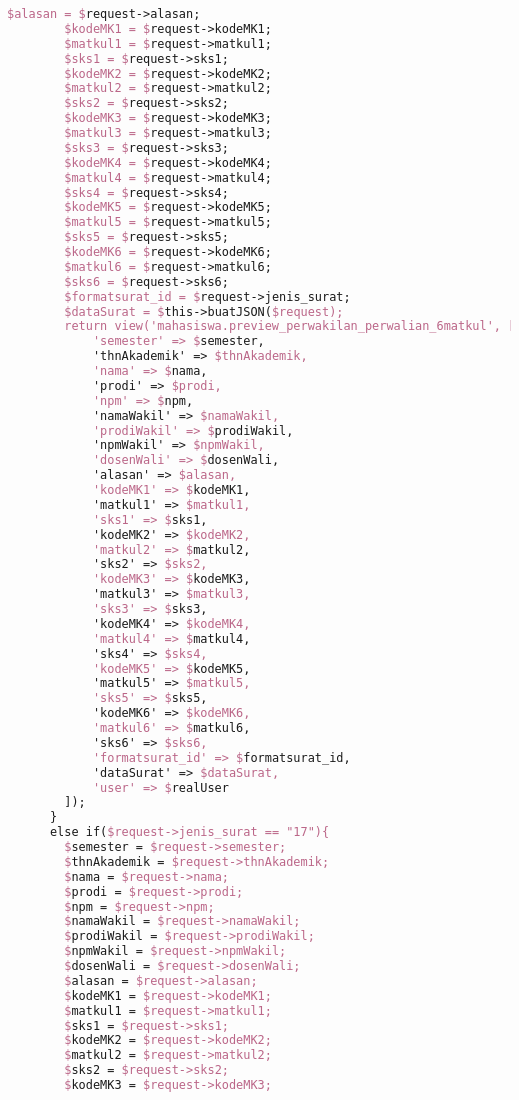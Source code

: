 \begin{lstlisting}[language=tex,basicstyle=\tiny,caption=PesanansuratController.php]
        $alasan = $request->alasan;
        $kodeMK1 = $request->kodeMK1;
        $matkul1 = $request->matkul1;
        $sks1 = $request->sks1;
        $kodeMK2 = $request->kodeMK2;
        $matkul2 = $request->matkul2;
        $sks2 = $request->sks2;
        $kodeMK3 = $request->kodeMK3;
        $matkul3 = $request->matkul3;
        $sks3 = $request->sks3;
        $kodeMK4 = $request->kodeMK4;
        $matkul4 = $request->matkul4;
        $sks4 = $request->sks4;
        $kodeMK5 = $request->kodeMK5;
        $matkul5 = $request->matkul5;
        $sks5 = $request->sks5;
        $kodeMK6 = $request->kodeMK6;
        $matkul6 = $request->matkul6;
        $sks6 = $request->sks6;
        $formatsurat_id = $request->jenis_surat;
        $dataSurat = $this->buatJSON($request);
        return view('mahasiswa.preview_perwakilan_perwalian_6matkul', [
            'semester' => $semester,
            'thnAkademik' => $thnAkademik,
            'nama' => $nama,
            'prodi' => $prodi,
            'npm' => $npm,
            'namaWakil' => $namaWakil,
            'prodiWakil' => $prodiWakil,
            'npmWakil' => $npmWakil,
            'dosenWali' => $dosenWali,
            'alasan' => $alasan,
            'kodeMK1' => $kodeMK1,
            'matkul1' => $matkul1,
            'sks1' => $sks1,
            'kodeMK2' => $kodeMK2,
            'matkul2' => $matkul2,
            'sks2' => $sks2,
            'kodeMK3' => $kodeMK3,
            'matkul3' => $matkul3,
            'sks3' => $sks3,
            'kodeMK4' => $kodeMK4,
            'matkul4' => $matkul4,
            'sks4' => $sks4,
            'kodeMK5' => $kodeMK5,
            'matkul5' => $matkul5,
            'sks5' => $sks5,
            'kodeMK6' => $kodeMK6,
            'matkul6' => $matkul6,
            'sks6' => $sks6,
            'formatsurat_id' => $formatsurat_id,
            'dataSurat' => $dataSurat,
            'user' => $realUser
        ]);
      }
      else if($request->jenis_surat == "17"){
        $semester = $request->semester;
        $thnAkademik = $request->thnAkademik;
        $nama = $request->nama;
        $prodi = $request->prodi;
        $npm = $request->npm;
        $namaWakil = $request->namaWakil;
        $prodiWakil = $request->prodiWakil;
        $npmWakil = $request->npmWakil;
        $dosenWali = $request->dosenWali;
        $alasan = $request->alasan;
        $kodeMK1 = $request->kodeMK1;
        $matkul1 = $request->matkul1;
        $sks1 = $request->sks1;
        $kodeMK2 = $request->kodeMK2;
        $matkul2 = $request->matkul2;
        $sks2 = $request->sks2;
        $kodeMK3 = $request->kodeMK3;

\end{lstlisting}
